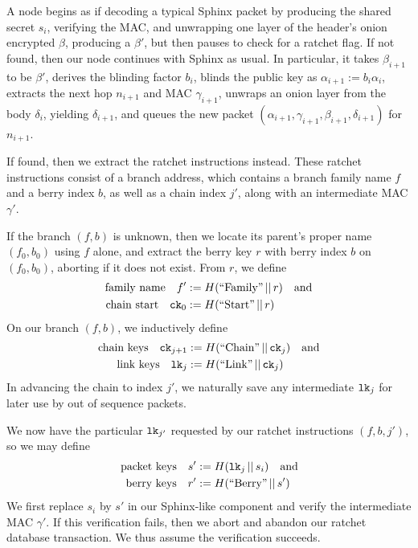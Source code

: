 \documentclass[twoside,letterpaper]{llncs}
\def\mathperiod{.}
\def\mathcomma{}
\def\mathperiod{}
\begin{document}
A node begins as if decoding a typical Sphinx packet by
 producing the shared secret $s_i$, verifying the MAC, and 
 unwrapping one layer of the header's onion encrypted $\beta$,
producing a $\beta'$,
but then pauses to check for a ratchet flag. 
If not found, then our node continues with Sphinx as usual.
In particular, it takes $\beta_{i+1}$ to be $\beta'$,
derives the blinding factor $b_i$,
blinds the public key as $\alpha_{i+1} := b_i \alpha_i$,
extracts the next hop $n_{i+1}$ and MAC $\gamma_{i+1}$,
unwraps an onion layer from the body $\delta_i$,
 yielding $\delta_{i+1}$, and queues the new packet
$(\alpha_{i+1},\gamma_{i+1},\beta_{i+1},\delta_{i+1})$ for $n_{i+1}$.

If found, then we extract the ratchet instructions instead.
These ratchet instructions consist of a branch address,
which contains a branch family name $f$ and a berry index $b$,
 as well as a chain index $j'$,
along with an intermediate MAC $\gamma'$.

If the branch $(f,b)$ is unknown, then we locate its parent's
proper name $(f_0,b_0)$ using $f$ alone, and extract the berry
key $r$ with berry index $b$ on $(f_0,b_0)$,
 aborting if it does not exist.
From $r$, we define
\[ \begin{aligned}
\textrm{family name}\quad
 f' &:= H(\textrm{``Family''} \,||\, r) \quad\textrm{and} \\ %
\textrm{chain start}\quad
 \ck_0 &:= H(\textrm{``Start''} \,||\, r) \mathperiod \\
\end{aligned} \]
On our branch $(f,b)$, we inductively define 
\[ \begin{aligned}
\textrm{chain keys}\quad
 \ck_{j+1} &:= H(\textrm{``Chain''} \,||\, \ck_j) \quad\textrm{and} \\ %
\textrm{link keys}\quad
 \lk_j &:= H(\textrm{``Link''} \,||\, \ck_j) \mathperiod \\
\end{aligned} \]
In advancing the chain to index $j'$, we naturally save any 
intermediate $\texttt{lk}_j$ for later use by out of sequence packets.

We now have the particular $\texttt{lk}_{j'}$ requested by our ratchet 
instructions $(f,b,j')$, so we may define 
\[ \begin{aligned}
\textrm{packet keys}\quad 
 s' &:= H(\lk_j \,||\, s_i) \quad\textrm{and} \\ %
\textrm{berry keys}\quad 
 r' &:= H(\textrm{``Berry''} \,||\, s') \mathperiod \\
\end{aligned} \]
We first replace $s_i$ by $s'$ in our Sphinx-like component
and verify the intermediate MAC $\gamma'$.  If this verification
fails, then we abort and abandon our ratchet database transaction.
We thus assume the verification succeeds.  
\end{document}
